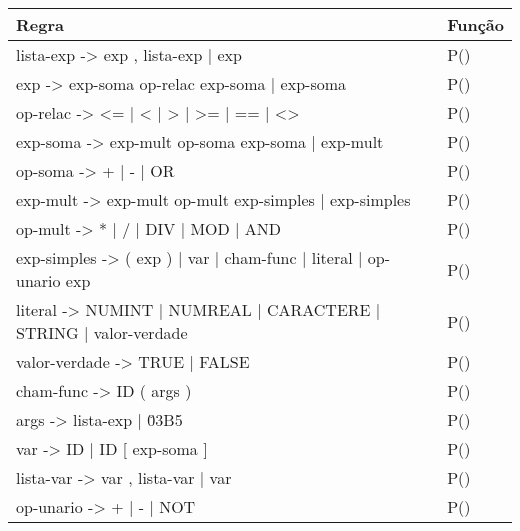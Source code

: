 \documentclass[12pt,oneside,a4paper,chapter=TITLE,section=TITLE,sumario=tradicional]{abntex2}
\begin{document}
\begin{quadro}[htb]
    \centering
    \vspace{0.5cm}
    \begin{tabular}[h]{|p{13.0cm}|p{2.0cm}|}
        \hline
        \textbf{Regra} & \textbf{Função} \\ 
        \hline\hline
	lista-exp  -> exp , lista-exp | exp  & P() \\ \hline 
	exp -> exp-soma op-relac exp-soma | exp-soma  & P() \\ \hline 
	op-relac -> <= | < | > | >= | == | <>  & P()   \\ \hline 
	exp-soma -> exp-mult op-soma exp-soma | exp-mult  & P()   \\ \hline 
	op-soma -> + | - | OR  & P()   \\ \hline 
	exp-mult -> exp-mult op-mult exp-simples | exp-simples  & P()   \\ \hline 
	op-mult -> * | / | DIV | MOD | AND  & P()   \\ \hline 
	exp-simples -> ( exp ) | var | cham-func | literal | op-unario exp  & P()   \\ \hline 
	literal -> NUMINT | NUMREAL | CARACTERE | STRING | valor-verdade  & P()   \\ \hline 
	valor-verdade -> TRUE | FALSE  & P()   \\ \hline 
	cham-func -> ID ( args )  & P()   \\ \hline 
	args -> lista-exp | \u03B5  & P()   \\ \hline 
	var -> ID | ID [ exp-soma ]  & P()   \\ \hline 
	lista-var  -> var , lista-var | var  & P()   \\ \hline 
	op-unario -> + | - | NOT  & P()   \\ \hline 
    \end{tabular}
\end{quadro}
\end{document}
